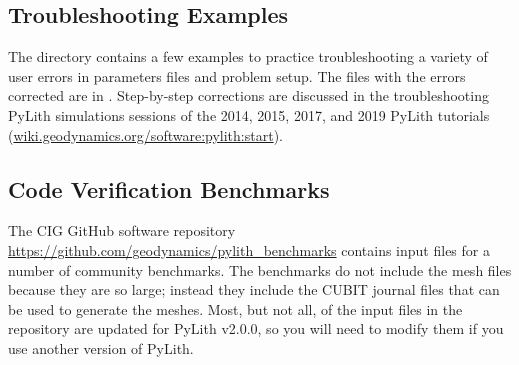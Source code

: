 \subsection{Troubleshooting Examples}
\label{sub:troubleshooting:examples}

The directory  contains a few examples to
practice troubleshooting a variety of user errors in parameters files and
problem setup. The files with the errors corrected are in
.  Step-by-step corrections are
discussed in the troubleshooting PyLith simulations sessions of the
2014, 2015, 2017, and 2019 PyLith tutorials
(\url{wiki.geodynamics.org/software:pylith:start}).


\subsection{Code Verification Benchmarks}

The CIG GitHub software repository \url{https://github.com/geodynamics/pylith_benchmarks}
contains input files for a number of community benchmarks. The benchmarks
do not include the mesh files because they are so large; instead they
include the CUBIT journal files that can be used to generate the meshes.
Most, but not all, of the input files in the repository are updated
for PyLith v2.0.0, so you will need to modify them if you use another
version of PyLith.


